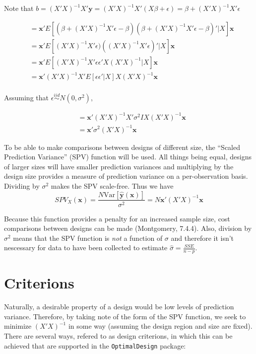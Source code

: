 \documentclass{article}\usepackage[]{graphicx}\usepackage[]{color}
\newcommand{\Var}{\mathrm{Var}}
\begin{document}
Note that $b=(X'X)^{-1} X'\textbf{y} = (X'X)^{-1}X'(X\beta+\epsilon) = \beta + (X'X)^{-1} X'\epsilon$

\begin{align*}
  &= \textbf{x}' E[(\beta + (X'X)^{-1}X'\epsilon - \beta)(\beta + (X'X)^{-1}X'\epsilon - \beta)' | X] \textbf{x} \\
  &= \textbf{x}' E[(X'X)^{-1}X'\epsilon)((X'X)^{-1}X'\epsilon)' | X] \textbf{x} \\
  &= \textbf{x}' E[(X'X)^{-1}X'\epsilon \epsilon' X (X'X)^{-1} | X] \textbf{x} \\
  &= \textbf{x}' (X'X)^{-1} X' E[\epsilon \epsilon' | X] X(X'X)^{-1} \textbf{x} \\
\end{align*}

Assuming that $\epsilon \stackrel{iid}{\sim} N(0,\sigma^2) $,

\begin{align*}
  &= \textbf{x}' (X'X)^{-1} X' \sigma^2 I X(X'X)^{-1} \textbf{x} \\
  &= \textbf{x}' \sigma^2 (X' X)^{-1} \textbf{x}
\end{align*}

To be able to make comparisons between designs of different size, the ``Scaled Prediction Variance'' (SPV) function will be used. All things being equal, designs of larger sizes will have smaller prediction variances and multiplying by the design size provides a measure of prediction variance on a per-observation basis. Dividing by $\sigma^2$ makes the SPV scale-free. Thus we have
$$ SPV_X(\textbf{x}) = \frac{N \Var[\hat{\textbf{y}}(\textbf{x})]}{\sigma^2} = N \textbf{x}' (X' X)^{-1} \textbf{x} $$

Because this function provides a penalty for an increased sample size, cost comparisons between designs can be made (Montgomery, 7.4.4). Also, division by $\sigma^2$ means that the SPV function is \textit{not} a function of $\sigma$ and therefore it isn't nescessary for data to have been collected to estimate $\hat{\sigma} = \frac{SSE}{n-p}$.

\section{Criterions}
Naturally, a desirable property of a design would be low levels of prediction variance. Therefore, by taking note of the form of the SPV function, we seek to minimize $(X'X)^{-1}$ in some way (assuming the design region and size are fixed). There are several ways, refered to as design criterions, in which this can be achieved that are supported in the \texttt{OptimalDesign} package:
\end{document}
